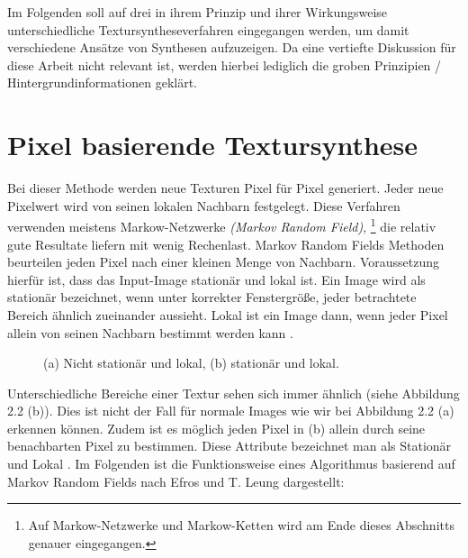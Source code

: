\documentclass[12pt, a4paper,twoside,openright]{report} %
\begin{document}
Im Folgenden soll auf drei in ihrem Prinzip und ihrer Wirkungsweise unterschiedliche Textursyntheseverfahren eingegangen werden,
um damit verschiedene Ansätze von Synthesen aufzuzeigen.
Da eine vertiefte Diskussion für diese Arbeit nicht relevant ist, werden hierbei lediglich die groben Prinzipien / Hintergrundinformationen geklärt.

\section{Pixel basierende Textursynthese}

Bei dieser Methode werden neue Texturen Pixel für Pixel generiert.
Jeder neue Pixelwert wird von seinen lokalen Nachbarn festgelegt.
Diese Verfahren verwenden meistens Markow-Netzwerke \textit{(Markov Random Field)},
\footnote[1]{Auf Markow-Netzwerke und Markow-Ketten wird am Ende dieses Abschnitts genauer eingegangen.}
die relativ gute Resultate liefern mit wenig Rechenlast.
Markov Random Fields Methoden beurteilen jeden Pixel nach einer kleinen Menge von Nachbarn.
Voraussetzung hierfür ist, dass das Input-Image stationär und lokal ist.
Ein Image wird als stationär bezeichnet, wenn unter korrekter Fenstergröße,
jeder betrachtete Bereich ähnlich zueinander aussieht.
Lokal ist ein Image dann, wenn jeder Pixel allein von seinen Nachbarn bestimmt werden kann \cite{GomathiShah2009}.

\begin{figure}[H]
    \centering
    \qquad
    \caption{(a) Nicht stationär und lokal, (b) stationär und lokal.}%
\end{figure}

Unterschiedliche Bereiche einer Textur sehen sich immer ähnlich {(siehe Abbildung 2.2 (b))}.
Dies ist nicht der Fall für normale Images wie wir bei Abbildung 2.2 {(a)} erkennen können.
Zudem ist es möglich jeden Pixel in {(b)} allein durch seine benachbarten Pixel zu bestimmen.
Diese Attribute bezeichnet man als Stationär und Lokal \cite{GomathiShah2009}.
Im Folgenden ist die Funktionsweise eines Algorithmus basierend auf Markov Random Fields nach Efros und T. Leung dargestellt: \cite{Efros99}
\end{document}
